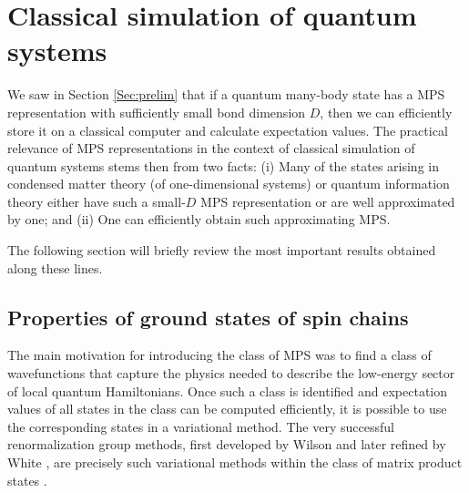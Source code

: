 \documentclass[aps,prl,epsfig,graphics,floatfix,mathbbm,a4paper]{article}
\newcommand{\1}{\mathbbm{1}}
\renewcommand{\>}{\rangle}
\newcommand{\<}{\langle}
\begin{document}
\section{Classical simulation of quantum systems}\label{sec:classical-sim}

We saw in Section \ref{Sec:prelim} that if a quantum many-body
state has a MPS representation with sufficiently small bond
dimension $D$, then we can efficiently store it on a classical
computer and calculate expectation values. The practical relevance
of MPS representations in the context of classical simulation of
quantum systems stems then from two facts: (i) Many of the states
arising in
condensed matter theory (of one-dimensional systems) or
quantum information theory either have such a small-$D$ MPS
representation or are well approximated by one; and (ii) One can
efficiently obtain such approximating MPS.

The following section will briefly review the most important
results obtained along these lines.

\subsection{Properties of ground states of spin chains}
The main motivation for introducing the class of MPS was to find a
class of wavefunctions that capture the physics needed to describe
the low-energy sector of local quantum Hamiltonians. Once such a
class is identified and expectation values of all states in the
class can be computed efficiently, it is possible to use the
corresponding states in a variational method. The very successful
renormalization group methods, first developed by Wilson
\cite{Wilson} and later refined by White \cite{White}, are
precisely such variational methods within the class of matrix
product states \cite{Ostlund,vonDelft,VPC04}.
\end{document}
